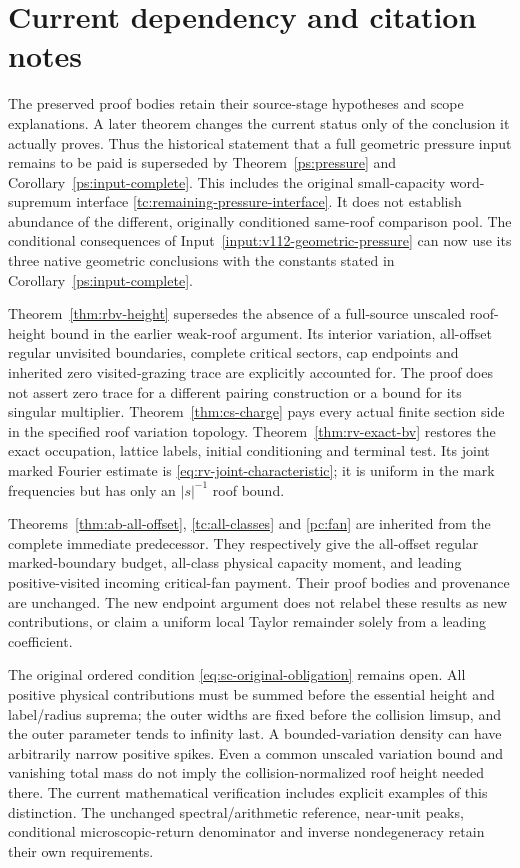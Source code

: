 \section{Current dependency and citation notes}
\label{sec:current-dependencies}
The preserved proof bodies retain their source-stage hypotheses
and scope explanations. A later theorem changes the current status
only of the conclusion it actually proves. Thus the historical
statement that a full geometric pressure input remains to be paid
is superseded by Theorem~\ref{ps:pressure} and
Corollary~\ref{ps:input-complete}. This includes the original
small-capacity word-supremum interface
\eqref{tc:remaining-pressure-interface}. It does not establish
abundance of the different, originally conditioned same-roof
comparison pool. The conditional consequences of
Input~\ref{input:v112-geometric-pressure} can now use its three
native geometric conclusions with the constants stated in
Corollary~\ref{ps:input-complete}.

Theorem~\ref{thm:rbv-height} supersedes the absence of a full-source
unscaled roof-height bound in the earlier weak-roof argument. Its
interior variation, all-offset regular unvisited boundaries,
complete critical sectors, cap endpoints and inherited zero
visited-grazing trace are explicitly accounted for. The proof does
not assert zero trace for a different pairing construction or a
bound for its singular multiplier. Theorem~\ref{thm:cs-charge}
pays every actual finite section side in the specified roof
variation topology. Theorem~\ref{thm:rv-exact-bv} restores the
exact occupation, lattice labels, initial conditioning and
terminal test. Its joint marked Fourier estimate is
\eqref{eq:rv-joint-characteristic}; it is uniform in the mark
frequencies but has only an $|s|^{-1}$ roof bound.

Theorems~\ref{thm:ab-all-offset}, \ref{tc:all-classes} and
\ref{pc:fan} are inherited from the complete immediate predecessor.
They respectively give the all-offset regular marked-boundary
budget, all-class physical capacity moment, and leading
positive-visited incoming critical-fan payment. Their proof bodies
and provenance are unchanged. The new endpoint argument does not
relabel these results as new contributions, or claim a uniform
local Taylor remainder solely from a leading coefficient.

The original ordered condition \eqref{eq:sc-original-obligation}
remains open. All positive physical contributions must be summed
before the essential height and label/radius suprema; the outer
widths are fixed before the collision limsup, and the outer
parameter tends to infinity last. A bounded-variation density can
have arbitrarily narrow positive spikes. Even a common unscaled
variation bound and vanishing total mass do not imply the
collision-normalized roof height needed there. The current
mathematical verification includes explicit examples of this
distinction. The unchanged spectral/arithmetic reference, near-unit
peaks, conditional microscopic-return denominator and inverse
nondegeneracy retain their own requirements.

